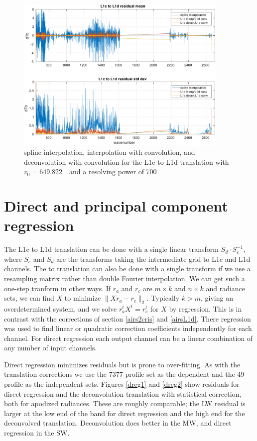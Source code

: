 \documentclass[11pt]{article}
\begin{document}
\begin{figure} %
  \centering
  \includegraphics[height=7.5cm]{figures/CtoD_interp_diff.pdf}
  \caption{spline interpolation, interpolation with convolution, 
    and deconvolution with convolution for the {\airs} L1c to L1d
    translation with $v_0=649.822$~\wn\ and a resolving power of 700}
  \label{interpL1d}
\end{figure}

\FloatBarrier
\section{Direct and principal component regression}
\label{dregr}

The {\airs} L1c to L1d translation can be done with a single linear
transform $S_d\cdot S_c^{-1}$, where $S_c$ and $S_d$ are the
transforms taking the intermediate grid to L1c and L1d channels.  
The {\airs} to {\cris} translation can also be done with a single
transform if we use a resampling matrix rather than double Fourier
interpolation.  We can get such a one-step tranform in other ways.
If $r_a$ and $r_c$ are $m \times k$ and $n \times k$ {\airs} and
{\cris} radiance sets, we can find $X$ to minimize $\|X r_a -
r_c\|_2$.  Typically $k > m$, giving an overdetermined system, and we
solve $r_a^t X^t = r_c^t$ for $X$ by regression.  This is in contrast
with the corrections of section \ref{airs2cris} and \ref{airsL1d}.
There regression was used to find linear or quadratic correction
coefficients independently for each channel.  For direct regression
each output channel can be a linear combination of any number of
input channels.

Direct regression minimizes residuals but is prone to over-fitting.
As with the translation corrections we use the 7377 profile set as
the dependent and the 49 profile as the independent sets.  Figures
\ref{dreg1} and \ref{dreg2} show residuals for direct regression and
the deconvolution translation with statistical correction, both for
apodized radiances.  These are roughly comparable; the LW residual
is larger at the low end of the band for direct regression and the
high end for the deconvolved translation.  Deconvolution does better
in the MW, and direct regression in the SW.
\end{document}
